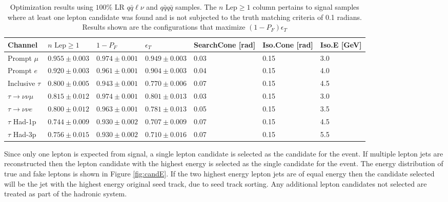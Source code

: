 \begin{table}

\begin{tabular}{|p{}|p{}p{}p{}p{}p{}p{}|}

\hline 
Channel & $n \, \, \text{Lep} \geq 1$ & $1-P_{F}$ & $\epsilon_T$ & SearchCone [rad] & Iso.Cone [rad] & Iso.E [GeV] \\ 
\hline 
Prompt $\mu$ & $0.955 \pm 0.003$ & $0.974 \pm 0.001$ & $0.949 \pm 0.003$ & 0.03 & 0.15 & 3.0 \\ 

Prompt $e$ & $0.920 \pm 0.003$ & $0.961 \pm 0.001$ & $0.904 \pm 0.003$ & 0.04 & 0.15 & 4.0 \\ 

Inclusive $\tau$ & $0.800 \pm 0.005$ & $0.943 \pm 0.001$ &  $0.770 \pm 0.006$ & 0.07 & 0.15 & 4.5 \\ 


 \hline
$\tau \rightarrow \nu \nu \mu$ & $0.815 \pm 0.012$ & $0.974 \pm 0.001$ & $0.801 \pm 0.013$ & 0.03 & 0.15 & 3.0 \\ 
 
$\tau \rightarrow \nu \nu e$ &  $0.800 \pm 0.012$ & $0.963 \pm 0.001$ &  $0.781 \pm 0.013$ & 0.05 & 0.15 & 3.5 \\ 
 
$\tau$ Had-1p & $0.744 \pm 0.009$ & $0.930 \pm 0.002$ & $0.707 \pm 0.009$ & 0.07 & 0.15 & 4.5 \\ 
 
$\tau$ Had-3p &  $0.756 \pm 0.015$ & $0.930 \pm 0.002$ & $0.710 \pm 0.016$ & 0.07 & 0.15 & 5.5  \\
\hline
\end{tabular} 
\caption{Optimization results using $100 \%$ LR $q\bar{q}\ell \nu$ and $q\bar{q} q\bar{q}$ samples. The $n \, \, \text{Lep} \geq 1$ column pertains to signal samples where at least one lepton candidate was found and is not subjected to the truth matching criteria of 0.1 radians. Results shown are the configurations that maximize $(1-P_F)\epsilon_T$ }
\label{tab:taufinderopt}
\end{table}

Since only one lepton is expected from signal, a single lepton candidate is selected as the candidate for the event. If multiple lepton jets are reconstructed then the lepton candidate with the highest energy is selected as the single candidate for the event. The energy distribution of true and fake leptons is shown in Figure \ref{fig:candE}. If the two highest energy lepton jets are of equal energy then the candidate selected will be the jet with the highest energy original seed track, due to seed track sorting.  Any additional lepton candidates not selected are treated as part of the hadronic system.


